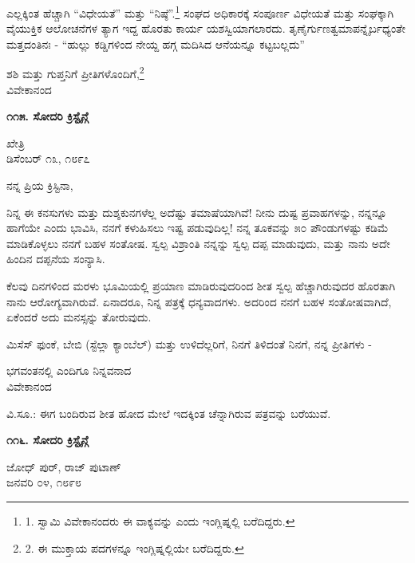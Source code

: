 ಎಲ್ಲಕ್ಕಿಂತ ಹೆಚ್ಚಾಗಿ “ವಿಧೇಯತೆ” ಮತ್ತು “ನಿಷ್ಠೆ”.\footnote{1. ಸ್ವಾಮಿ ವಿವೇಕಾನಂದರು ಈ ವಾಕ್ಯವನ್ನು  ಎಂದು ಇಂಗ್ಲಿಷ್ನಲ್ಲಿ ಬರೆದಿದ್ದರು.} ಸಂಘದ ಅಧಿಕಾರಕ್ಕೆ ಸಂಪೂರ್ಣ ವಿಧೇಯತೆ ಮತ್ತು ಸಂಘಕ್ಕಾಗಿ ವೈಯುಕ್ತಿಕ ಆಲೋಚನೆಗಳ ತ್ಯಾಗ ಇದ್ದ ಹೊರತು ಕಾರ್ಯ ಯಶಸ್ವಿಯಾಗಲಾರದು. ತೃಣೈರ್ಗುಣತ್ವಮಾಪನ್ನೈರ್ಬಧ್ಯಂತೇ ಮತ್ತದಂತಿನಃ - “ಹುಲ್ಲು ಕಡ್ಡಿಗಳಿಂದ ನೇಯ್ದ ಹಗ್ಗ ಮದಿಸಿದ ಆನೆಯನ್ನೂ ಕಟ್ಟಬಲ್ಲದು”

\begin{flushright}
ಶಶಿ ಮತ್ತು ಗುಪ್ತನಿಗೆ ಪ್ರೀತಿಗಳೊಂದಿಗೆ,\footnote{2. ಈ ಮುಕ್ತಾಯ ಪದಗಳನ್ನೂ ಇಂಗ್ಲಿಷ್ನಲ್ಲಿಯೇ ಬರೆದಿದ್ದರು.}\\ವಿವೇಕಾನಂದ
\end{flushright}

\begin{center}
\textbf{೧೧೫. ಸೋದರಿ ಕ್ರಿಸ್ಟೈನ್ಗೆ}
\end{center}

\begin{flushright}
ಖೇತ್ರಿ\\ಡಿಸೆಂಬರ್ ೧೩, ೧೮೯೭
\end{flushright}

ನನ್ನ ಪ್ರಿಯ ಕ್ರಿಸ್ಟಿನಾ,

ನಿನ್ನ ಈ ಕನಸುಗಳು ಮತ್ತು ದುಶ್ಶಕುನಗಳೆಲ್ಲ ಅದೆಷ್ಟು ತಮಾಷೆಯಾಗಿವೆ! ನೀನು ದುಷ್ಟ ಪ್ರವಾಹಗಳನ್ನು, ನನ್ನನ್ನೂ ಹಾಗೆಯೇ ಎಂದು ಭಾವಿಸಿ, ನನಗೆ ಕಳುಹಿಸಲು ಇಷ್ಟ ಪಡುವುದಿಲ್ಲ! ನನ್ನ ತೂಕವನ್ನು ೫೦ ಪೌಂಡುಗಳಷ್ಟು ಕಡಿಮೆ ಮಾಡಿಕೊಳ್ಳಲು ನನಗೆ ಬಹಳ ಸಂತೋಷ. ಸ್ವಲ್ಪ ವಿಶ್ರಾಂತಿ ನನ್ನನ್ನು ಸ್ವಲ್ಪ ದಪ್ಪ ಮಾಡುವುದು, ಮತ್ತು ನಾನು ಅದೇ ಹಿಂದಿನ ದಪ್ಪನೆಯ ಸಂನ್ಯಾಸಿ.

ಕೆಲವು ದಿನಗಳಿಂದ ಮರಳು ಭೂಮಿಯಲ್ಲಿ ಪ್ರಯಾಣ ಮಾಡಿರುವುದರಿಂದ ಶೀತ ಸ್ವಲ್ಪ ಹೆಚ್ಚಾಗಿರುವುದರ ಹೊರತಾಗಿ ನಾನು ಆರೋಗ್ಯವಾಗಿರುವೆ. ಏನಾದರೂ, ನಿನ್ನ ಪತ್ರಕ್ಕೆ ಧನ್ಯವಾದಗಳು. ಅದರಿಂದ ನನಗೆ ಬಹಳ ಸಂತೋಷವಾಗಿದೆ, ಏಕೆಂದರೆ ಅದು ಮನಸ್ಸನ್ನು ತೋರುವುದು.

ಮಿಸೆಸ್ ಫುಂಕೆ, ಬೇಬಿ (ಸ್ಟೆಲ್ಲಾ ಕ್ಯಾಂಬೆಲ್) ಮತ್ತು ಉಳಿದೆಲ್ಲರಿಗೆ, ನಿನಗೆ ತಿಳಿದಂತೆ ನಿನಗೆ, ನನ್ನ ಪ್ರೀತಿಗಳು -

\begin{flushright}
ಭಗವಂತನಲ್ಲಿ ಎಂದಿಗೂ ನಿನ್ನವನಾದ\\ವಿವೇಕಾನಂದ
\end{flushright}

ವಿ.ಸೂ.: ಈಗ ಬಂದಿರುವ ಶೀತ ಹೋದ ಮೇಲೆ ಇದಕ್ಕಿಂತ ಚೆನ್ನಾಗಿರುವ ಪತ್ರವನ್ನು ಬರೆಯುವೆ.

\begin{center}
\textbf{೧೧೬. ಸೋದರಿ ಕ್ರಿಸ್ಟೈನ್ಗೆ}
\end{center}

\begin{flushright}
ಜೋಧ್ ಪುರ್, ರಾಜ್ ಪುಟಾಣ್\\ಜನವರಿ ೦೪, ೧೮೯೮
\end{flushright}

